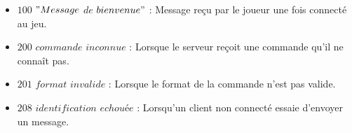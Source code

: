 \par
\begin{itemize}

	\item $100$ $"Message$ $de$ $bienvenue"$ :
	Message reçu par le joueur une fois connecté au jeu.

	\item $200$ $commande$ $inconnue$ : 
	Lorsque le serveur reçoit une commande qu'il ne connaît pas.

	\item $201$ $format$ $invalide$ :
	Lorsque le format de la commande n'est pas valide.

	\item $208$ $identification$ $echouée$ : 
	Lorsqu'un client non connecté essaie d'envoyer un message.\\

\end{itemize}